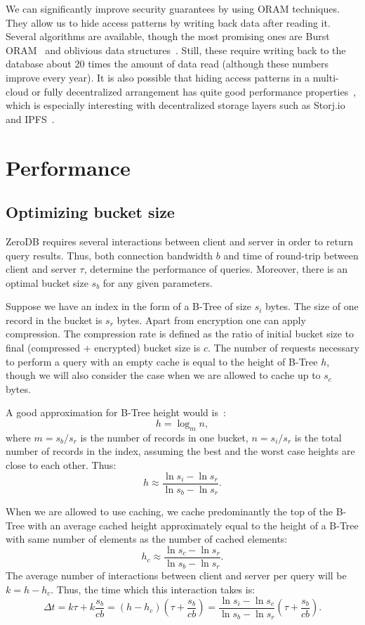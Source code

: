 \documentclass[notitlepage]{revtex4-1}
\begin{document}
We can significantly improve security guarantees by using ORAM techniques.
They allow us to hide access patterns by writing back data after reading it.
Several algorithms are available, though the most promising ones are Burst ORAM~\cite{burst-oram}
and oblivious data structures~\cite{ods-wang-2014}.
Still, these require writing back to the database about 20 times the amount of data read
(although these numbers improve every year).
It is also possible that hiding access patterns in a multi-cloud or fully decentralized arrangement has quite good performance properties~\cite{oram-multicloud},
which is especially interesting with decentralized storage layers such as Storj.io~\cite{storj} and IPFS~\cite{ipfs}.

\section{Performance}

\subsection{Optimizing bucket size}


ZeroDB requires several interactions between client and server in order to return query results.
Thus, both connection bandwidth $b$ and time of round-trip between client and server $\tau$, determine the performance of queries.
Moreover, there is an optimal bucket size $s_b$ for any given parameters.

Suppose we have an index in the form of a B-Tree of size $s_i$ bytes.
The size of one record in the bucket is $s_r$ bytes.
Apart from encryption one can apply compression.
The compression rate is defined as the ratio of initial bucket size to final (compressed + encrypted) bucket size is $c$.
The number of requests necessary to perform a query with an empty cache is equal to the height of B-Tree $h$, though we will also consider the case when we are allowed to cache up to $s_c$ bytes.


A good approximation for B-Tree height would is~\cite{wiki:b-tree}:
$$h = \log_m n,$$
where $m = s_b/s_r$ is the number of records in one bucket,
$n = s_i/s_r$ is the total number of records in the index,
assuming the best and the worst case heights are close to each other.
Thus:
$$h \approx \frac{\ln s_i - \ln s_r}{\ln s_b - \ln s_r}.$$

When we are allowed to use caching, we cache predominantly the top of the B-Tree with an average cached height approximately equal to the height of a B-Tree with same number of elements as the number of cached elements:
$$h_c \approx \frac{\ln s_c - \ln s_r}{\ln s_b - \ln s_r}.$$
The average number of interactions between client and server per query will be $k = h - h_c$.
Thus, the time which this interaction takes is:
$$\Delta t = k\tau + k\frac{s_b}{cb} =
\left(h - h_c \right) \left( \tau + \frac{s_b}{cb} \right) =
\frac{\ln s_i - \ln s_c}{\ln s_b - \ln s_r} \left( \tau + \frac{s_b}{cb} \right).$$
\end{document}
